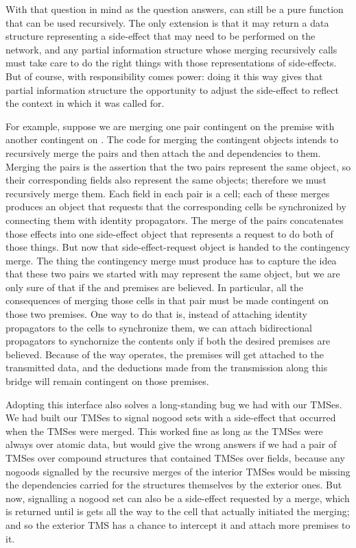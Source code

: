 \documentclass[12pt,letterpaper]{article}
\begin{document}
With that question in mind as the question  answers,
 can still be a pure function that can be used
recursively.  The only extension is that it may return a data
structure representing a side-effect that may need to be performed on
the network, and any partial information structure whose merging
recursively calls  must take care to do the right things
with those representations of side-effects.  But of course, with
responsibility comes power: doing it this way gives that partial
information structure the opportunity to adjust the side-effect to
reflect the context in which it was called for.

For example, suppose we are merging one pair contingent on the premise
 with another contingent on .  The code for
merging the contingent objects intends to recursively merge the pairs
and then attach the  and  dependencies to them.
Merging the pairs is the assertion that the two pairs represent the
same object, so their corresponding fields also represent the same
objects; therefore we must recursively merge them.  Each field in each
pair is a cell; each of these merges produces an object that requests
that the corresponding cells be synchronized by connecting them with
identity propagators.  The merge of the pairs concatenates those
effects into one side-effect object that represents a request to do
both of those things.  But now that side-effect-request object is
handed to the contingency merge.  The thing the contingency merge must
produce has to capture the idea that these two pairs we started with
may represent the same object, but we are only sure of that if the
 and  premises are believed.  In particular, all
the consequences of merging those cells in that pair must be made
contingent on those two premises.  One way to do that is, instead of
attaching identity propagators to the cells to synchronize them, we
can attach bidirectional  propagators to synchornize the
contents only if both the desired premises are believed.  Because of
the way  operates, the premises will get attached to the
transmitted data, and the deductions made from the transmission along
this bridge will remain contingent on those premises.

Adopting this interface also solves a long-standing bug we had with
our TMSes.  We had built our TMSes to signal nogood sets with a
side-effect that occurred when the TMSes were merged.  This worked
fine as long as the TMSes were always over atomic data, but would give
the wrong answers if we had a pair of TMSes over compound structures
that contained TMSes over fields, because any nogoods signalled by the
recursive merges of the interior TMSes would be missing the
dependencies carried for the structures themselves by the exterior
ones.  But now, signalling a nogood set can also be a side-effect
requested by a merge, which is returned until is gets all the way to
the cell that actually initiated the merging; and so the exterior TMS
has a chance to intercept it and attach more premises to it.
\end{document}
